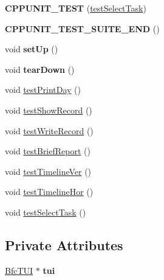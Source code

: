 \begin{DoxyCompactItemize}
\item 
\hypertarget{classFixtureBfcTUI_aee14bdd7c7098919f4326e15c6964ac8}{{\bfseries C\-P\-P\-U\-N\-I\-T\-\_\-\-T\-E\-S\-T} (\hyperlink{classFixtureBfcTUI_af8094a2b684afd71a4fcd284b87d0d34}{test\-Select\-Task})}\label{classFixtureBfcTUI_aee14bdd7c7098919f4326e15c6964ac8}

\item 
\hypertarget{classFixtureBfcTUI_ad6e1b7f4c9f203f5658bffe053308099}{{\bfseries C\-P\-P\-U\-N\-I\-T\-\_\-\-T\-E\-S\-T\-\_\-\-S\-U\-I\-T\-E\-\_\-\-E\-N\-D} ()}\label{classFixtureBfcTUI_ad6e1b7f4c9f203f5658bffe053308099}

\item 
\hypertarget{classFixtureBfcTUI_a3010f0f9937f15195e495ea9a1e5ab6f}{void {\bfseries set\-Up} ()}\label{classFixtureBfcTUI_a3010f0f9937f15195e495ea9a1e5ab6f}

\item 
\hypertarget{classFixtureBfcTUI_ab4463e013d6dbc615ce48ff89c930b04}{void {\bfseries tear\-Down} ()}\label{classFixtureBfcTUI_ab4463e013d6dbc615ce48ff89c930b04}

\item 
void \hyperlink{classFixtureBfcTUI_a0e6e249a57e8679db2fe58e606986b95}{test\-Print\-Day} ()
\item 
void \hyperlink{classFixtureBfcTUI_a8b307755f136be0db22d450e9724bf2a}{test\-Show\-Record} ()
\item 
void \hyperlink{classFixtureBfcTUI_a4a099462414f1ee59f0458e7ba35857f}{test\-Write\-Record} ()
\item 
void \hyperlink{classFixtureBfcTUI_adbbb524adf16d7057835ea25c4a13369}{test\-Brief\-Report} ()
\item 
void \hyperlink{classFixtureBfcTUI_aef00e5a6e84b832da4ec58aa1f804d33}{test\-Timeline\-Ver} ()
\item 
void \hyperlink{classFixtureBfcTUI_a84e72246b10ab731470fcb9818f452e2}{test\-Timeline\-Hor} ()
\item 
void \hyperlink{classFixtureBfcTUI_af8094a2b684afd71a4fcd284b87d0d34}{test\-Select\-Task} ()
\end{DoxyCompactItemize}
\subsection*{Private Attributes}
\begin{DoxyCompactItemize}
\item 
\hypertarget{classFixtureBfcTUI_ac3c3908c2c87a93f297e6b742fafd68e}{\hyperlink{classBfcTUI}{Bfc\-T\-U\-I} $\ast$ {\bfseries tui}}\label{classFixtureBfcTUI_ac3c3908c2c87a93f297e6b742fafd68e}

\end{DoxyCompactItemize}


